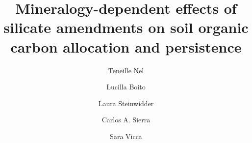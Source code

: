 \documentclass[preprint,12pt]{elsarticle}
\begin{document}
\begin{frontmatter}

\title{Mineralogy-dependent effects of silicate amendments on soil organic carbon allocation and persistence}

\author[aff1]{Teneille Nel}

\author[aff1]{Lucilla Boito}

\author[aff1]{Laura Steinwidder}

\author[aff2]{Carlos A. Sierra}

\author[aff1]{Sara Vicca}

\address[aff1]{
    Department of Soil Science,
    University Name,
    City,
    Country
}

\address[aff2]{
    Department of Environmental Science,
    University Name,
    City,
    Country
}


\begin{abstract}


\end{abstract}
\end{frontmatter}
\end{document}
